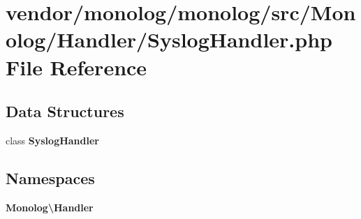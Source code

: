 \section{vendor/monolog/monolog/src/\+Monolog/\+Handler/\+Syslog\+Handler.php File Reference}
\label{_syslog_handler_8php}
\subsection*{Data Structures}
\begin{DoxyCompactItemize}
\item 
class {\bf Syslog\+Handler}
\end{DoxyCompactItemize}
\subsection*{Namespaces}
\begin{DoxyCompactItemize}
\item 
 {\bf Monolog\textbackslash{}\+Handler}
\end{DoxyCompactItemize}
